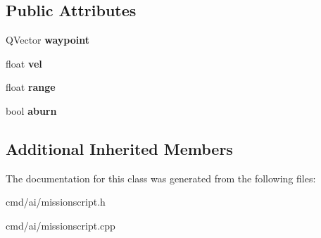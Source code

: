 \subsection*{Public Attributes}
\begin{DoxyCompactItemize}
\item 
Q\+Vector {\bfseries waypoint}\hypertarget{classAIFlyToWaypoint_ad72acc6f92025c88f3d374ec4a0bcd13}{}\label{classAIFlyToWaypoint_ad72acc6f92025c88f3d374ec4a0bcd13}

\item 
float {\bfseries vel}\hypertarget{classAIFlyToWaypoint_ac56a2b9c330d25118e4ea91e09ae1ccf}{}\label{classAIFlyToWaypoint_ac56a2b9c330d25118e4ea91e09ae1ccf}

\item 
float {\bfseries range}\hypertarget{classAIFlyToWaypoint_a5bab35342ac5b3bba050771879765d7f}{}\label{classAIFlyToWaypoint_a5bab35342ac5b3bba050771879765d7f}

\item 
bool {\bfseries aburn}\hypertarget{classAIFlyToWaypoint_a3f38ba77de88d128d3e8d74f870dda94}{}\label{classAIFlyToWaypoint_a3f38ba77de88d128d3e8d74f870dda94}

\end{DoxyCompactItemize}
\subsection*{Additional Inherited Members}


The documentation for this class was generated from the following files\+:\begin{DoxyCompactItemize}
\item 
cmd/ai/missionscript.\+h\item 
cmd/ai/missionscript.\+cpp\end{DoxyCompactItemize}
